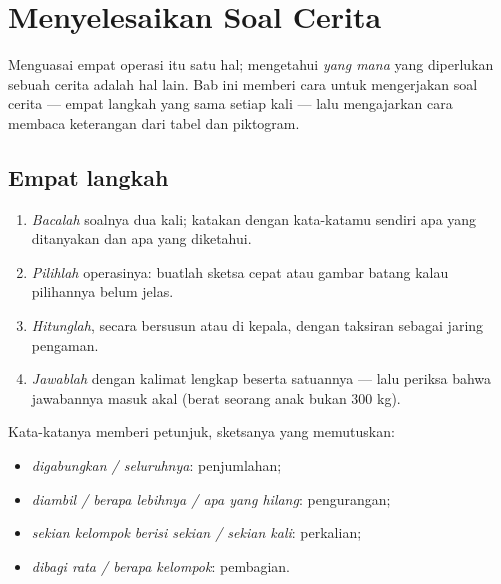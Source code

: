 \chapter{Menyelesaikan Soal Cerita}\label{ch:g3:problems}

Menguasai empat operasi itu satu hal; mengetahui \emph{yang mana}
yang diperlukan sebuah cerita adalah hal lain. Bab ini memberi cara
untuk mengerjakan soal cerita --- empat langkah yang sama setiap
kali --- lalu mengajarkan cara membaca keterangan dari tabel dan
piktogram.

\section{Empat langkah}

\begin{method}\label{met:g3:problems:steps}
\begin{enumerate}
  \item \emph{Bacalah} soalnya dua kali; katakan dengan kata-katamu
        sendiri apa yang ditanyakan dan apa yang diketahui.
  \item \emph{Pilihlah} operasinya: buatlah sketsa cepat atau gambar
        batang kalau pilihannya belum jelas.
  \item \emph{Hitunglah}, secara bersusun atau di kepala, dengan
        taksiran sebagai jaring pengaman.
  \item \emph{Jawablah} dengan kalimat lengkap beserta satuannya ---
        lalu periksa bahwa jawabannya masuk akal (berat seorang anak
        bukan $300$ kg).
\end{enumerate}
\end{method}

\begin{example}\label{ex:g3:problems:which}
Kata-katanya memberi petunjuk, sketsanya yang memutuskan:
\begin{itemize}
  \item \emph{digabungkan / seluruhnya}: penjumlahan;
  \item \emph{diambil / berapa lebihnya / apa yang hilang}:
        pengurangan;
  \item \emph{sekian kelompok berisi sekian / sekian kali}:
        perkalian;
  \item \emph{dibagi rata / berapa kelompok}: pembagian.
\end{itemize}
\end{example}

